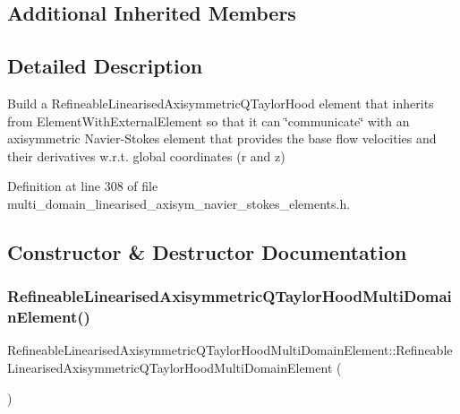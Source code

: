 \subsection*{Additional Inherited Members}


\subsection{Detailed Description}
Build a Refineable\+Linearised\+Axisymmetric\+Q\+Taylor\+Hood element that inherits from Element\+With\+External\+Element so that it can \char`\"{}communicate\char`\"{} with an axisymmetric Navier-\/\+Stokes element that provides the base flow velocities and their derivatives w.\+r.\+t. global coordinates (r and z) 

Definition at line 308 of file multi\+\_\+domain\+\_\+linearised\+\_\+axisym\+\_\+navier\+\_\+stokes\+\_\+elements.\+h.



\subsection{Constructor \& Destructor Documentation}
\mbox{\label{classRefineableLinearisedAxisymmetricQTaylorHoodMultiDomainElement_a449140eab46a0e96a3ee1ad0f9481ffe}} 
\subsubsection{\texorpdfstring{Refineable\+Linearised\+Axisymmetric\+Q\+Taylor\+Hood\+Multi\+Domain\+Element()}{RefineableLinearisedAxisymmetricQTaylorHoodMultiDomainElement()}}
{\footnotesize\ttfamily Refineable\+Linearised\+Axisymmetric\+Q\+Taylor\+Hood\+Multi\+Domain\+Element\+::\+Refineable\+Linearised\+Axisymmetric\+Q\+Taylor\+Hood\+Multi\+Domain\+Element (\begin{DoxyParamCaption}{ }\end{DoxyParamCaption})\hspace{0.3cm}{\ttfamily [inline]}}



